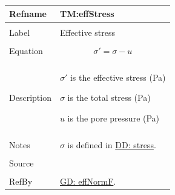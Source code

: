 \documentclass[12pt]{article}
\begin{document}
\noindent \begin{minipage}{\textwidth}
\begin{tabular}{p{} p{}}
\toprule \textbf{Refname} & \textbf{TM:effStress}
\label{TM:effStress}
\\ \midrule \\
Label & Effective stress
\\ \midrule \\
Equation & \begin{displaymath}
           σ'=σ-u
           \end{displaymath}
\\ \midrule \\
Description & \begin{symbDescription}
              \item{$σ'$ is the effective stress (Pa)}
              \item{$σ$ is the total stress (Pa)}
              \item{$u$ is the pore pressure (Pa)}
              \end{symbDescription}
\\ \midrule \\
Notes & $σ$ is defined in \hyperref[DD:stress]{DD: stress}.
\\ \midrule \\
Source & \cite{fredlund1977}
\\ \midrule \\
RefBy & \hyperref[GD:effNormF]{GD: effNormF}.
\\ \bottomrule \end{tabular}
\end{minipage}
\par~
\end{document}
